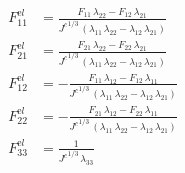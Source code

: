 \begin{align}
F^{\mathrm el}_{11} &= \frac{F_{11}\,\lambda _{22}-F_{12}\,\lambda _{21}}{{J^{c}}^{1/3}\,\left(\lambda _{11}\,\lambda _{22}-\lambda _{12}\,\lambda _{21}\right)} \\ 
F^{\mathrm el}_{21} &= \frac{F_{21}\,\lambda _{22}-F_{22}\,\lambda _{21}}{{J^{c}}^{1/3}\,\left(\lambda _{11}\,\lambda _{22}-\lambda _{12}\,\lambda _{21}\right)} \\ 
F^{\mathrm el}_{12} &= -\frac{F_{11}\,\lambda _{12}-F_{12}\,\lambda _{11}}{{J^{c}}^{1/3}\,\left(\lambda _{11}\,\lambda _{22}-\lambda _{12}\,\lambda _{21}\right)} \\ 
F^{\mathrm el}_{22} &= -\frac{F_{21}\,\lambda _{12}-F_{22}\,\lambda _{11}}{{J^{c}}^{1/3}\,\left(\lambda _{11}\,\lambda _{22}-\lambda _{12}\,\lambda _{21}\right)} \\ 
F^{\mathrm el}_{33} &= \frac{1}{{J^{c}}^{1/3}\,\lambda _{33}} 
\end{align}
